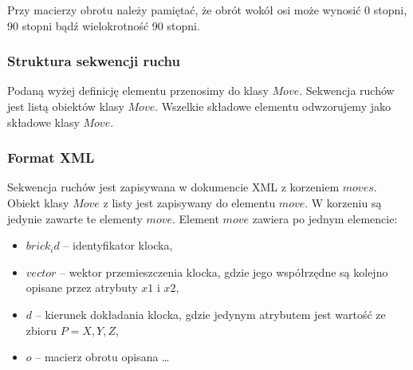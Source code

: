 \documentclass[12pt]{article}
\begin{document}
Przy macierzy obrotu należy pamiętać, że obrót wokół osi może wynosić
0 stopni, 90 stopni bądź wielokrotność 90 stopni.

\subsubsection{Struktura sekwencji ruchu}
Podaną wyżej definicję elementu przenosimy do klasy $Move$. Sekwencja
ruchów jest listą obiektów klasy $Move$. Wszelkie składowe elementu
odwzorujemy jako składowe klasy $Move$.

\subsubsection{Format XML}
Sekwencja ruchów jest zapisywana w dokumencie XML z korzeniem $moves$.
Obiekt klasy $Move$ z listy jest zapisywany do elementu $move$. W korzeniu
są jedynie zawarte te elementy $move$. Element $move$ zawiera po jednym
elemencie:
\begin{itemize}
	\item $brick_id$ -- identyfikator klocka,
	\item $vector$ -- wektor przemieszczenia klocka, gdzie jego współrzędne
		są kolejno opisane przez atrybuty $x1$ i $x2$,
	\item $d$ -- kierunek dokładania klocka, gdzie jedynym atrybutem
		jest wartość ze zbioru $P = {X,Y,Z}$,
	\item $o$ -- macierz obrotu opisana \ldots
\end{itemize}
\end{document}
